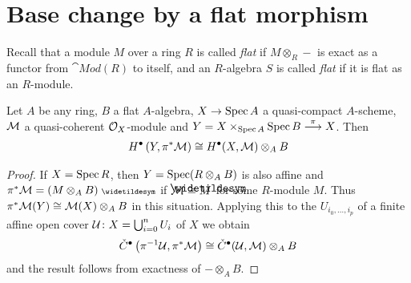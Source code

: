 \documentclass[a4paper,parskip=half,numbers=enddot, DIV=12]{scrreprt}
\begin{document}
\section{Base change by a flat morphism}
Recall that a module $M$ over a ring $R$ is called \emph{flat} if $M\otimes_R-$ is exact as a functor from $\cat{Mod}(R)$ to itself, and an $R$-algebra $S$ is called \emph{flat} if it is flat as an $R$-module.
\begin{fact}
	Let $A$ be any ring, $B$ a flat $A$-algebra, $X\morphism\Spec A$ a quasi-compact $A$-scheme, $\mathcal{M}$ a quasi-coherent $\mathcal{O}_X$-module and $Y=X\times_{\Spec A}\Spec B\morphism[\pi]X$. Then
	\begin{align*}
		H^\bullet\left(Y,\pi^*\mathcal{M}\right)\cong H^\bullet(X,\mathcal{M})\otimes_AB
	\end{align*}
\end{fact}
\begin{proof}
	If $X=\operatorname{Spec} R$, then $Y=\operatorname{Spec} (R\otimes_AB)$ is also affine and $\pi^*\Mm=(M\otimes_AB)^\qcmod$ if $\Mm\cong \snake{M}$ for some $R$-module $M$. Thus $\pi^*\mathcal{M}(Y)\cong \mathcal{M}(X)\otimes_AB$ in this situation. Applying this to the $U_{i_0,\ldots,i_p}$ of a finite affine open cover $\mathcal{U}\colon X=\bigcup_{i=0}^nU_i$ of $X$ we obtain 
	\begin{align*}
		\check{C}^\bullet\left(\pi^{-1}\mathcal{U},\pi^*\mathcal{M}\right)\cong\check{C}^\bullet(\mathcal{U},\mathcal{M})\otimes_AB
	\end{align*}
	and the result follows from exactness of $-\otimes_AB$.
\end{proof}
\end{document}
